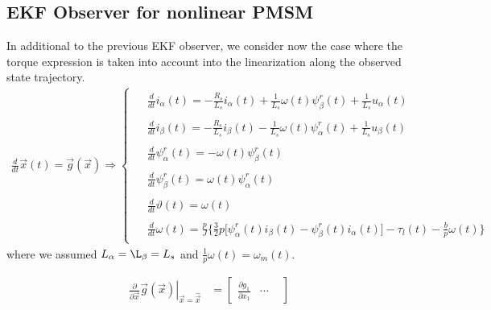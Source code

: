 \documentclass[12pt,a4paper,oneside]{book}
\begin{document}
\begin{onehalfspace}
\subsection{EKF Observer for nonlinear PMSM}
In additional to the previous EKF observer, we consider now the case where the torque expression is taken into account into the linearization along the observed state trajectory.
\begin{align}\label{}
	\frac{d}{dt}\vec{x}(t)=\vec{g}(\vec{x})\Rightarrow\left\lbrace 
	\begin{aligned}
		\begin{split}
			&\frac{d}{dt}i_\alpha(t) = -\frac{R_s}{L_s}i_\alpha(t) + 	
			\frac{1}{L_s}\omega(t)\psi_\beta^r(t) + \frac{1}{L_s} u_\alpha(t) 
		\end{split}	\\[6pt]
		\begin{split}
			&\frac{d}{dt}i_\beta(t) = -\frac{R_s}{L_s}i_\beta(t) - 	
			\frac{1}{L_s}\omega(t)\psi_\alpha^r(t) + \frac{1}{L_s} u_\beta(t)	
		\end{split}	\\[6pt]
		\begin{split}
			&\frac{d}{dt}\psi_\alpha^r(t) = -\omega(t)\psi_\beta^r(t)
		\end{split}	\\[6pt]
		\begin{split}	
			&\frac{d}{dt}\psi_\beta^r(t) = \omega(t)\psi_\alpha^r(t)	
		\end{split}	\\[6pt]
		\begin{split}
			&\frac{d}{dt}\vartheta(t) = \omega(t)
		\end{split}	\\[6pt]
		\begin{split}
			&\frac{d}{dt}\omega(t) = 
			\frac{p}{J}\Bigg\{\frac{3}{2}p\Big[\psi^r_{\alpha}(t)i_{\beta}(t) - 
			\psi^r_{\beta}(t)i_{\alpha}(t)\Big] - \tau_l(t) 
			-\frac{b}{p}\omega(t)\Bigg\}
		\end{split}
	\end{aligned}\right. 
\end{align}
where we assumed $L_\alpha = \L_\beta = L_s$ and $\frac{1}{p}\omega(t) = \omega_m(t)$.
\begin{mybox}
	\begin{equation}\label{}
		\begin{aligned}
			\left.\frac{\partial}{\partial 
				\vec{x}}\vec{g}(\vec{x})\right|_{\vec{x}=\hat{\vec{x}}} &= 
			\begin{bmatrix} \frac{\partial g_1}{\partial x_1} & \cdots & 

\end{bmatrix}
\end{aligned}
\end{equation}
\end{mybox}
\end{onehalfspace}
\end{document}
